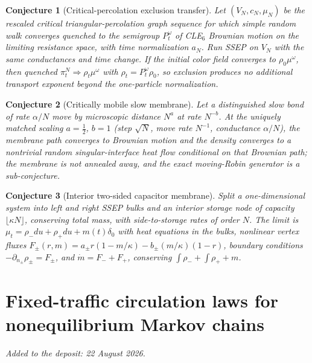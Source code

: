\documentclass[11pt]{article}
\newtheorem{conjecture}{Conjecture}
\theoremstyle{definition}
\begin{document}
\begin{conjecture}[Critical-percolation exclusion transfer]\label{an13}
Let $(V_N,c_N,\mu_N)$ be the rescaled critical triangular-percolation graph sequence for which simple random walk converges quenched to the semigroup $P_t^\omega$ of CLE$_6$ Brownian motion on the limiting resistance space, with time normalization $a_N$.  Run SSEP on $V_N$ with the same conductances and time change.  If the initial color field converges to $\rho_0\mu^\omega$, then quenched $\pi_t^N\Rightarrow\rho_t\mu^\omega$ with $\rho_t=P_t^\omega\rho_0$, so exclusion produces no additional transport exponent beyond the one-particle normalization.
\end{conjecture}

\begin{conjecture}[Critically mobile slow membrane]\label{an14}
Let a distinguished slow bond of rate $\alpha/N$ move by microscopic distance $N^a$ at rate $N^{-b}$.  At the uniquely matched scaling $a=\tfrac12$, $b=1$ (step $\sqrt N$, move rate $N^{-1}$, conductance $\alpha/N$), the membrane path converges to Brownian motion and the density converges to a nontrivial random singular-interface heat flow conditional on that Brownian path; the membrane is not annealed away, and the exact moving-Robin generator is a sub-conjecture.
\end{conjecture}

\begin{conjecture}[Interior two-sided capacitor membrane]\label{an15}
Split a one-dimensional system into left and right SSEP bulks and an interior storage node of capacity $\lfloor\kappa N\rfloor$, conserving total mass, with side-to-storage rates of order $N$.  The limit is $\mu_t=\rho_-du+\rho_+du+m(t)\delta_0$ with heat equations in the bulks, nonlinear vertex fluxes $F_\pm(r,m)=a_\pm r(1-m/\kappa)-b_\pm(m/\kappa)(1-r)$, boundary conditions $-\partial_{n_\pm}\rho_\pm=F_\pm$, and $\dot m=F_-+F_+$, conserving $\int\rho_-+\int\rho_++m$.
\end{conjecture}


\part{Fixed-traffic circulation laws for nonequilibrium Markov chains}

\medskip\noindent\emph{Added to the deposit: 22 August 2026.}\par\medskip
\end{document}
